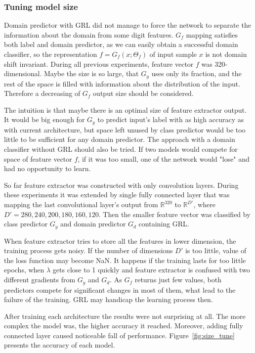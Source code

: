 \documentclass{article}
\begin{document}
\subsubsection{Tuning model size}
Domain predictor with GRL did not manage to force the network to separate the information about the domain from some digit features. $G_{f}$ mapping satisfies both label and domain predictor, as we can easily obtain a successful domain classifier, so the representation $f=G_{f}(x;\Theta_{f})$ of input sample $x$ is not domain shift invariant. During all previous experiments, feature vector $f$ was 320-dimensional. Maybe the size is so large, that $G_{y}$ uses only its fraction, and the rest of the space is filled with information about the distribution of the input. Therefore a decreasing of $G_{f}$ output size should be considered.
\par
The intuition is that maybe there is an optimal size of feature extractor output. It would be big enough for $G_{y}$ to predict input's label with as high accuracy as with current architecture, but space left unused by class predictor would be too little to be sufficient for any domain predictor. The approach with a domain classifier without GRL should also be tried. If two models would compete for space of feature vector $f$, if it was too small, one of the network would "lose" and had no opportunity to learn.
\par
So far feature extractor was constructed with only convolution layers. During these experiments it was extended by single fully connected layer that was mapping the last convolutional layer's output from $\mathbb{R}^{320}$ to $\mathbb{R}^{D'}$, where $D' = 280, 240, 200, 180, 160, 120$. Then the smaller feature vector was classified by class predictor $G_{y}$ and domain predictor $G_{d}$ containing GRL. 
\par
When feature extractor tries to store all the features in lower dimension, the training process gets noisy. If the number of dimensions $D'$ is too little, value of the loss function may become NaN. It happens if the training lasts for too little epochs, when $\lambda$ gets close to 1 quickly and feature extractor is confused with two different gradients from $G_{y}$ and $G_{d}$. As $G_{f}$ returns just few values, both predictors compete for significant changes in most of them, what lead to the failure of the training. GRL may handicap the learning process then.
\par
After training each architecture the results were not surprising at all. The more complex the model was, the higher accuracy it reached. Moreover, adding fully connected layer caused noticeable fall of performance.  Figure~\ref{fig:size_tune} presents the accuracy of each model. 
\end{document}
